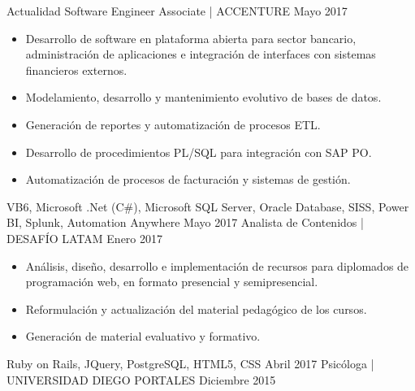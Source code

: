 %
%
%
\begin{experiences}
  \experience
    {Actualidad}   {Software Engineer Associate | ACCENTURE}{}{} 
    {Mayo 2017} {
                      \begin{itemize}
                        \item Desarrollo de software en plataforma abierta para sector bancario, administración de aplicaciones e integración de interfaces con sistemas financieros externos.
                        \item Modelamiento, desarrollo y mantenimiento evolutivo de bases de datos. 
                        \item Generación de reportes y automatización de procesos ETL.
                        \item Desarrollo de procedimientos PL/SQL para integración con SAP PO.
                        \item Automatización de procesos de facturación y sistemas de gestión.
                      \end{itemize}
                    }
                    {VB6, Microsoft .Net (C\#), Microsoft SQL Server, Oracle Database, SISS, Power BI, Splunk, Automation Anywhere}
  \emptySeparator
  \experience
    {Mayo 2017} {Analista de Contenidos | DESAFÍO LATAM}{}{}
    {Enero 2017}    {
                      \begin{itemize}
                        \item Análisis, diseño, desarrollo e implementación de recursos para diplomados de programación web, en formato presencial y semipresencial.
                        \item Reformulación y actualización del material pedagógico de los cursos.
                        \item Generación de material evaluativo y formativo.
                      \end{itemize}
                    }
                    {Ruby on Rails, JQuery, PostgreSQL, HTML5, CSS}
  \emptySeparator
  \experience
    {Abril 2017}     {Psicóloga | UNIVERSIDAD DIEGO PORTALES}{}{}
    {Diciembre 2015}    {
                      \begin{itemize}

\end{itemize}}
\end{experiences}
